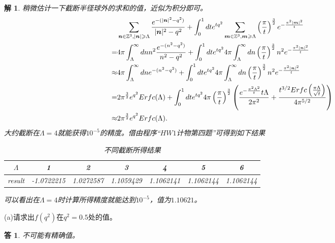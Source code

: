 \documentclass[10pt]{ctexart}
\newtheorem*{answer}{答}
\newtheorem*{solution}{解}
\begin{document}
\begin{solution}
    稍微估计一下截断半径球外的求和的值，近似为积分即可。
    \begin{align}
        &\sum\limits_{\bm{n}\in\mathbb{Z}^3,\lvert\bm{n}\rvert\geqslant\Lambda}\frac{e^{-(\lvert\bm{n}\rvert^2-q^2)}}{\lvert\bm{n}\rvert^2-q^2}+\int_{0}^{1}dte^{tq^2}\sum\limits_{\bm{m}\in\mathbb{Z}^3,\bm{m}\geqslant \Lambda}\left(\frac{\pi}{t}\right)^{\frac{3}{2}}e^{-\frac{\pi^2\lvert\bm{m}\rvert^2}{t}}\notag\\
        =&4\pi\int_{\Lambda}^{\infty}dnn^2\frac{e^{-(n^2-q^2)}}{n^2-q^2}+\int_{0}^{1}dte^{tq^2}4\pi\int_{\Lambda}^{\infty}dn\left(\frac{\pi}{t}\right)^{\frac{3}{2}}n^2e^{-\frac{\pi^2\lvert\bm{n}\rvert^2}{t}}\notag\\
        \approx&4\pi\int_{\Lambda}^{\infty}dne^{-(n^2-q^2)}+\int_{0}^{1}dte^{tq^2}4\pi\int_{\Lambda}^{\infty}dn\left(\frac{\pi}{t}\right)^{\frac{3}{2}}n^2e^{-\frac{\pi^2\lvert\bm{n}\rvert^2}{t}}\notag\\
        =&2\pi^{\frac{3}{2}}e^{q^2}Erfc(\Lambda)+\int_{0}^{1}dte^{tq^2}4\pi\left(\frac{\pi}{t}\right)^{\frac{3}{2}}\left(\frac{e^{-\frac{\pi^2\Lambda^2}{t}}t\Lambda}{2\pi^2}+\frac{t^{3/2}Erfc\left(\frac{\pi\Lambda}{\sqrt{t}}\right)}{4\pi^{5/2}}\right)\notag\\
        \approx&2\pi^{\frac{3}{2}}e^{q^2}Erfc(\Lambda).\notag
    \end{align}
    大约截断在$\Lambda=4$就能获得$10^{-5}$的精度。借由程序“$HW1$计物第四题”可得到如下结果
    \begin{table}[H]
        \centering
        \begin{tabular}{ccccccc}
            \toprule
            $\Lambda$ & 1 & 2 & 3 & 4 & 5 & 6\\
            \midrule
            result & -1.0722215 & 1.0272587 & 1.1059429 & 1.1062141 & 1.1062144 & 1.1062144\\
            \bottomrule
        \end{tabular}
        \caption{不同截断所得结果}
    \end{table}
    可以看出在$\Lambda=4$时计算所得精度就能达到$10^{-5}$，值为$1.10621$。
\end{solution}
(a)请求出$f(q^2)$在$q^2=0.5$处的值。
\begin{answer}
    不可能有精确值。
\end{answer}
\end{document}
